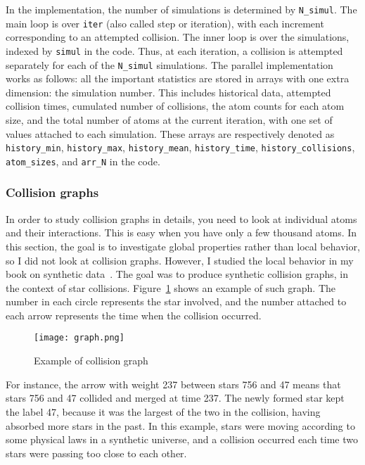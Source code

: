 \documentclass[oneside,10pt]{book}
\begin{document}
In the implementation, the number of simulations is determined by \texttt{N\_simul}. The main loop is over \texttt{iter} (also
 called step or iteration), with each increment corresponding to an attempted collision. The inner loop is over the simulations, indexed by \texttt{simul} in the code. Thus, at each iteration, a collision is attempted separately for each of the \texttt{N\_simul}
 simulations.  The parallel implementation works as follows: all the important statistics are stored in arrays with one extra dimension: the simulation number. This includes historical data, attempted collision times, cumulated number of collisions, the atom counts for each atom size, and the total number of atoms at the current iteration, with one set of values attached to each simulation. These arrays are respectively denoted as
 \texttt{history\_min}, \texttt{history\_max}, \texttt{history\_mean},
 \texttt{history\_time},
 \texttt{history\_collisions},
 \texttt{atom\_sizes}, and
 \texttt{arr\_N}
 in the code.  

\subsubsection{Collision graphs}

In order to study collision graphs in details, you need to look at individual atoms and their interactions. This is easy
 when you have only a few thousand atoms. In this section, the goal is to investigate global properties rather than local
 behavior, so I did not look at collision graphs. However, I studied the local behavior in my book on synthetic data~\cite{vgelsevier}. The goal was to produce
 synthetic collision graphs, in the context of star collisions. Figure~\ref{fig:pi1238675} shows an example of such graph.
 The number in each circle represents the star involved, and the number attached to each arrow represents the time when the collision occurred. 


\begin{figure}[H]
\centering
\texttt{[image: graph.png]}  
\caption{Example of collision graph}
\label{fig:pi1238675}
\end{figure}

For instance, the arrow with weight 237 between stars 756 and 47 means that stars 756 and 47 collided and merged at time 237. The newly formed star kept the label 47, because it was the largest of the two in the collision, having absorbed more stars in the past. In this example,
 stars were moving according to some physical laws in a synthetic universe, and a collision occurred each time two stars were passing too close to each other. 
\end{document}
